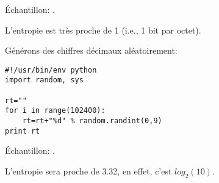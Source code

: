 Échantillon: .

L'entropie est très proche de 1 (i.e., 1 bit par octet).

Générons des chiffres décimaux aléatoirement:

\begin{lstlisting}[style=custompy]
#!/usr/bin/env python
import random, sys

rt=""
for i in range(102400):
    rt=rt+"%d" % random.randint(0,9)
print rt
\end{lstlisting}

Échantillon: .

L'entropie sera proche de 3.32, en effet, c'est $log_2(10)$.
